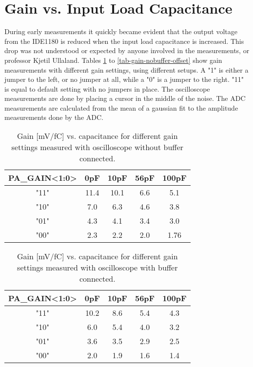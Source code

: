 \documentclass[../main/thesis.tex]{subfiles}
\begin{document}
\section{Gain vs. Input Load Capacitance}
\label{ide-gain}

During early measurements it quickly became evident that the output voltage from the IDE1180 is reduced when the input load capacitance is increased. This drop was not understood or expected by anyone involved in the measurements, or professor Kjetil Ullaland. Tables \ref{tab-gain-nobuffer} to \ref{tab-gain-nobuffer-offset} show gain measurements with different gain settings, using different setups. A "1" is either a jumper to the left, or no jumper at all, while a "0" is a jumper to the right. "11" is equal to default setting with no jumpers in place. The oscilloscope measurements are done by placing a cursor in the middle of the noise. The ADC measurements are calculated from the mean of a gaussian fit to the amplitude measurements done by the ADC. 

\begin{table}[h!]
	\begin{center}
		\caption{Gain [mV/fC] vs. capacitance for different gain settings measured with oscilloscope without buffer connected.}
		\label{tab-gain-nobuffer}
		\begin{tabular}{ccccc}\toprule
			\textbf{PA\_GAIN<1:0>} & \textbf{0pF}  & \textbf{10pF} & \textbf{56pF} & \textbf{100pF} \\ \midrule
			"11"     & 11.4 & 10.1 & 6.6  & 5.1   \\
			"10"     & 7.0    & 6.3  & 4.6  & 3.8   \\
			"01"     & 4.3  & 4.1  & 3.4  & 3.0     \\
			"00"     & 2.3  & 2.2  & 2.0    & 1.76 \\ \bottomrule
		\end{tabular}
	\end{center}
\end{table}

\begin{table}[h!]
	\begin{center}
		\caption{Gain [mV/fC] vs. capacitance for different gain settings measured with oscilloscope with buffer connected.}
		\label{tab-gain-wbuffer}
		\begin{tabular}{ccccc}\toprule
			\textbf{PA\_GAIN<1:0>} & \textbf{0pF}  & \textbf{10pF} & \textbf{56pF} & \textbf{100pF} \\ \midrule
			"11"     & 10.2 & 8.6  & 5.4  & 4.3   \\
			"10"     & 6.0    & 5.4  & 4.0    & 3.2   \\
			"01"     & 3.6  & 3.5  & 2.9  & 2.5   \\
			"00"     & 2.0    & 1.9  & 1.6  & 1.4 \\ \bottomrule
		\end{tabular}
	\end{center}
\end{table}
\end{document}
